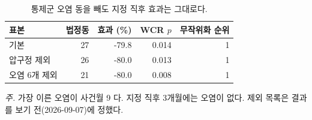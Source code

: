 \begin{table}[htbp]
  \centering
  \caption{통제군 오염 동을 빼도 지정 직후 효과는 그대로다.}
  \label{tab:contamination}
  \begin{tabular}{lrrrr}
    \toprule
    \textbf{표본} & \textbf{법정동} & \textbf{효과 (\%)} & \textbf{WCR $p$} & \textbf{무작위화 순위} \\
    \midrule
    기본 & 27 & -79.8 & 0.014 & 1 \\
    압구정 제외 & 26 & -80.0 & 0.013 & 1 \\
    오염 6개 제외 & 21 & -80.0 & 0.008 & 1 \\
    \bottomrule
  \end{tabular}

  \begin{minipage}{\linewidth}\footnotesize
  \textit{주.} 가장 이른 오염이 사건월 9 다. 지정 직후 3개월에는 오염이 없다. 제외 목록은 결과를 보기 전(2026-09-07)에 정했다.
  \end{minipage}
\end{table}
